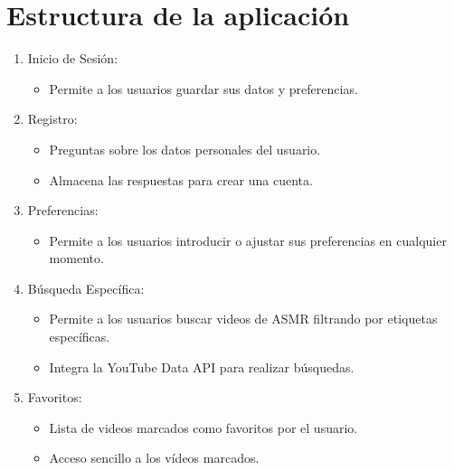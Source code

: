 \documentclass[a4paper,12pt,twoside]{memoir}
\begin{document}
\section{Estructura de la aplicación}
\begin{enumerate}
    \item Inicio de Sesión:
    \begin{itemize}
        \item Permite a los usuarios guardar sus datos y preferencias.
    \end{itemize}
    
    \item Registro:
    \begin{itemize}
        \item Preguntas sobre los datos personales del usuario.
        \item Almacena las respuestas para crear una cuenta.
    \end{itemize}
    
    \item Preferencias:
    \begin{itemize}
        \item Permite a los usuarios introducir o ajustar sus preferencias en cualquier momento.
    \end{itemize}
    
    \item Búsqueda Específica:
    \begin{itemize}
        \item Permite a los usuarios buscar videos de ASMR filtrando por etiquetas específicas.
        \item Integra la YouTube Data API para realizar búsquedas.
    \end{itemize}
    
    \item Favoritos:
    \begin{itemize}
        \item Lista de videos marcados como favoritos por el usuario.
        \item Acceso sencillo a los vídeos marcados.
    \end{itemize}
\end{enumerate}
\end{document}
